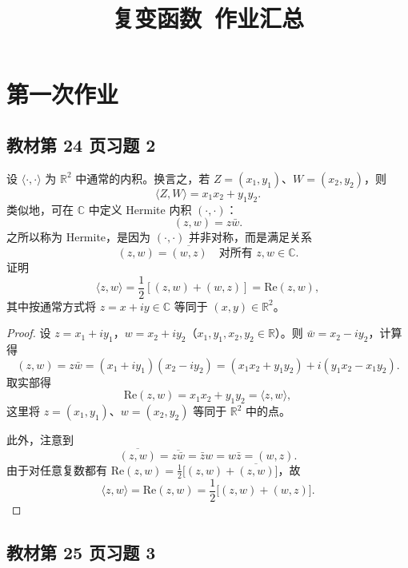 \documentclass[11pt,a4paper]{article}
\title{\textbf{复变函数\ 作业汇总}}
\author{}
\date{}
\newcommand{\R}{\mathbb{R}}
\renewcommand{\Re}{\mathrm{Re}}
\theoremstyle{definition}
\newcommand{\name}{姓名}
\newcommand{\uid}{学号}
\newcommand{\course}{复变函数}
\begin{document}
\pagestyle{fancy}
\fancyhead{}
\lhead{\name\ (\uid)}
\chead{\course\ 作业汇总}
\rhead{\thepage}

\maketitle
\thispagestyle{fancy}
\tableofcontents
\newpage

\section{第一次作业}

\subsection{教材第 24 页习题 2}

设 $\langle \cdot, \cdot \rangle$ 为 $\mathbb{R}^2$ 中通常的内积。换言之，若 $Z = (x_1, y_1)$、$W = (x_2, y_2)$，则
\[
  \langle Z, W \rangle = x_1 x_2 + y_1 y_2.
\]
类似地，可在 $\mathbb{C}$ 中定义 Hermite 内积 $(\cdot, \cdot)$：
\[
  (z, w) = z \bar{w}.
\]
之所以称为 Hermite，是因为 $(\cdot, \cdot)$ 并非对称，而是满足关系
\[
  (z, w) = \overline{(w, z)} \quad \text{对所有 } z, w \in \mathbb{C}.
\]
证明
\[
  \langle z, w \rangle = \frac{1}{2} [(z, w) + (w, z)] = \text{Re}(z, w),
\]
其中按通常方式将 $z = x + iy \in \mathbb{C}$ 等同于 $(x, y) \in \mathbb{R}^2$。

\begin{proof}
设 $z = x_1 + i y_1$，$w = x_2 + i y_2$（$x_1, y_1, x_2, y_2 \in \R$）。则 $\bar{w} = x_2 - i y_2$，计算得
\[
  (z, w) = z\bar{w} = (x_1 + i y_1)(x_2 - i y_2)
  = (x_1 x_2 + y_1 y_2) + i (y_1 x_2 - x_1 y_2).
\]
取实部得
\[
  \Re(z, w) = x_1 x_2 + y_1 y_2 = \langle z, w \rangle,
\]
这里将 $z = (x_1, y_1)$、$w = (x_2, y_2)$ 等同于 $\R^2$ 中的点。

此外，注意到
\[
  \overline{(z, w)} = \overline{z\bar{w}} = \bar{z}w = w\bar{z} = (w, z).
\]
由于对任意复数都有 $\Re(z, w) = \frac{1}{2}\big[(z, w) + \overline{(z, w)}\big]$，故
\[
  \langle z, w \rangle = \Re(z, w)
  = \frac{1}{2}\big[(z, w) + (w, z)\big].
\]
\end{proof}

\subsection{教材第 25 页习题 3}
\end{document}
